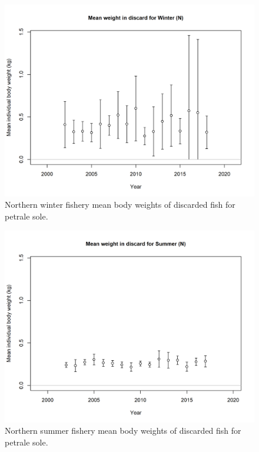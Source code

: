 \documentclass[12pt,]{article}
\begin{document}
\FloatBarrier

\begin{figure}
\centering
\includegraphics{r4ss/plots_mod1/bodywt_data_fltWinter (N).png}
\caption{Northern winter fishery mean body weights of discarded fish for
petrale sole. \label{fig:nw_bodywt}}
\end{figure}

\FloatBarrier

\begin{figure}
\centering
\includegraphics{r4ss/plots_mod1/bodywt_data_fltSummer (N).png}
\caption{Northern summer fishery mean body weights of discarded fish for
petrale sole. \label{fig:ns_bodywt}}
\end{figure}
\end{document}
